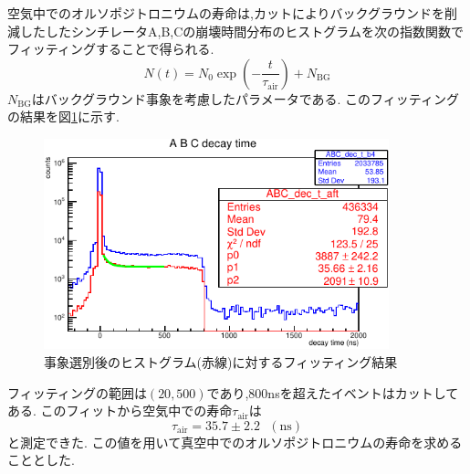 空気中でのオルソポジトロニウムの寿命は,カットによりバックグラウンドを削減したしたシンチレータA,B,Cの崩壊時間分布のヒストグラムを次の指数関数でフィッティングすることで得られる.
\begin{equation}
	\nonumber
N(t)=N_0\exp(-\frac{t}{\tau_\textrm{air}})+N_\textrm{BG}
\end{equation}
$N_\textrm{BG}$はバックグラウンド事象を考慮したパラメータである.
このフィッティングの結果を図\ref{fig:life_in_air}に示す.
\begin{figure}[H]
	\centering
		\includegraphics[width=10cm]{fig/isb/life_air.pdf}
		\caption{事象選別後のヒストグラム(赤線)に対するフィッティング結果}
		\label{fig:life_in_air}
\end{figure}
フィッティングの範囲は$(20,500)$であり,800nsを超えたイベントはカットしてある.
このフィットから空気中での寿命$\tau_\textrm{air}$は
\begin{equation}
	\nonumber
	\tau_\textrm{air}=35.7\pm 2.2 \hspace{8pt}(\textrm{ns})
\end{equation}
と測定できた.
この値を用いて真空中でのオルソポジトロニウムの寿命を求めることとした.

